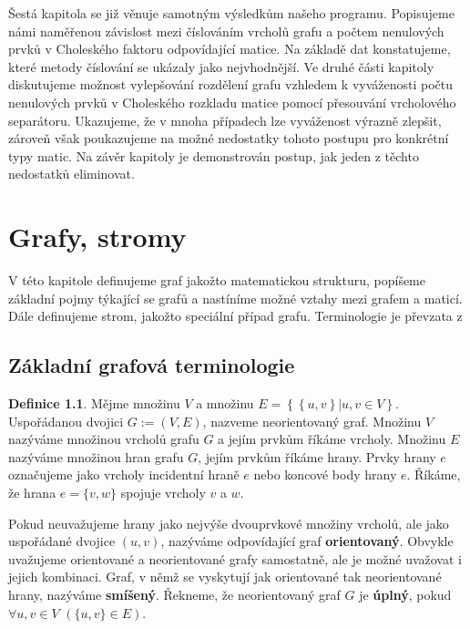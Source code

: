 \documentclass{ctuthesis}
\theoremstyle{plain}
\theoremstyle{definition}
\newtheorem{definition}{Definice}
\begin{document}
Šestá kapitola se již věnuje samotným výsledkům našeho programu. Popisujeme námi naměřenou závislost mezi číslováním vrcholů grafu a počtem nenulových prvků v Choleského faktoru odpovídající matice. Na základě dat konstatujeme, které metody číslování se ukázaly jako nejvhodnější. Ve druhé části kapitoly diskutujeme možnost vylepšování rozdělení grafu vzhledem k vyváženosti počtu nenulových prvků v Choleského rozkladu matice pomocí přesouvání vrcholového separátoru. Ukazujeme, že v mnoha případech lze vyváženost výrazně zlepšit, zároveň však poukazujeme na možné nedostatky tohoto postupu pro konkrétní typy matic. Na závěr kapitoly je demonstrován postup, jak jeden z těchto nedostatků eliminovat.




\chapter{Grafy, stromy}
V této kapitole definujeme graf jakožto matematickou strukturu, popíšeme základní pojmy týkající se grafů a nastíníme možné vztahy mezi grafem a maticí. Dále definujeme strom, jakožto speciální případ grafu. Terminologie je převzata z \cite{koub:11}

\section{Základní grafová terminologie}

\begin{definition}
  Mějme množinu $V$ a množinu $E = \left\{ \left\{ u,v \right\} | u,v \in V \right\}$. Uspořádanou dvojici $G := (V,E)$, nazveme neorientovaný graf. Množinu $V$ nazýváme množinou vrcholů grafu $G$ a jejím prvkům říkáme vrcholy. Množinu $E$ nazýváme množinou hran grafu $G$, jejím prvkům říkáme hrany. Prvky hrany $e$ označujeme jako vrcholy incidentní hraně $e$ nebo koncové body hrany $e$. Říkáme, že hrana $e = \{v,w\}$ spojuje vrcholy $v$ a $w$.
\end{definition}

Pokud neuvažujeme hrany jako nejvýše dvouprvkové množiny vrcholů, ale  jako uspořádané dvojice $(u,v)$, nazýváme odpovídající graf \textbf{orientovaný}. Obvykle uvažujeme orientované a neorientované grafy samostatně, ale je možné uvažovat i jejich kombinaci. Graf, v němž se vyskytují jak orientované tak neorientované hrany, nazýváme \textbf{smíšený}. Řekneme, že neorientovaný graf $G$ je \textbf{úplný}, pokud $\forall u, v \in V$ $\left(\{u,v\} \in E\right)$.
\end{document}
